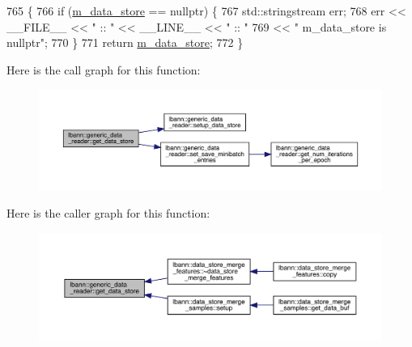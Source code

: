\begin{DoxyCode}
765                                               \{
766     \textcolor{keywordflow}{if} (\hyperlink{classlbann_1_1generic__data__reader_aefc076b842933a882214f4f709ca49c9}{m\_data\_store} == \textcolor{keyword}{nullptr}) \{
767       std::stringstream err;
768       err << \_\_FILE\_\_  << \textcolor{stringliteral}{" :: "} << \_\_LINE\_\_ << \textcolor{stringliteral}{" :: "}
769           << \textcolor{stringliteral}{" m\_data\_store is nullptr"};
770     \}
771     \textcolor{keywordflow}{return} \hyperlink{classlbann_1_1generic__data__reader_aefc076b842933a882214f4f709ca49c9}{m\_data\_store};
772   \}
\end{DoxyCode}
Here is the call graph for this function\+:\nopagebreak
\begin{figure}[H]
\begin{center}
\leavevmode
\includegraphics[width=350pt]{classlbann_1_1generic__data__reader_a2f1f018beecb1295c00a1ffdfa03f638_cgraph}
\end{center}
\end{figure}
Here is the caller graph for this function\+:\nopagebreak
\begin{figure}[H]
\begin{center}
\leavevmode
\includegraphics[width=350pt]{classlbann_1_1generic__data__reader_a2f1f018beecb1295c00a1ffdfa03f638_icgraph}
\end{center}
\end{figure}
\mbox{\label{classlbann_1_1generic__data__reader_ab4c6c2d4ba40ece809ce896828c8ff03}} 
